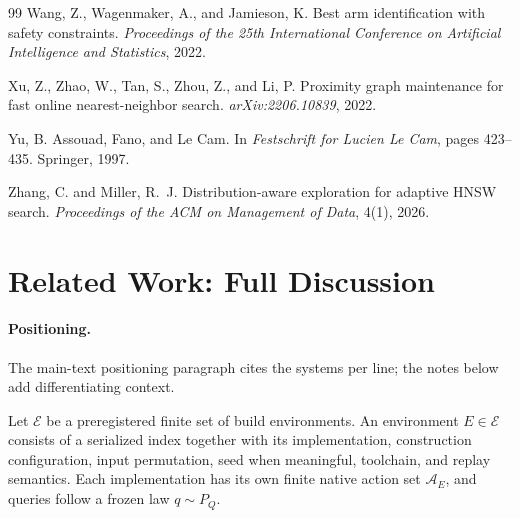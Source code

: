 \documentclass{article}
\newcommand{\Acal}{\mathcal{A}}
\newcommand{\Ecal}{\mathcal{E}}
\begin{document}
\begin{thebibliography}{99}
Wang, Z., Wagenmaker, A., and Jamieson, K.
Best arm identification with safety constraints.
\emph{Proceedings of the 25th International Conference on Artificial Intelligence and Statistics}, 2022.

Xu, Z., Zhao, W., Tan, S., Zhou, Z., and Li, P.
Proximity graph maintenance for fast online nearest-neighbor search.
\emph{arXiv:2206.10839}, 2022.

Yu, B.
Assouad, Fano, and Le Cam.
In \emph{Festschrift for Lucien Le Cam}, pages 423--435. Springer, 1997.

Zhang, C. and Miller, R.~J.
Distribution-aware exploration for adaptive HNSW search.
\emph{Proceedings of the ACM on Management of Data}, 4(1), 2026.

\end{thebibliography}


\appendix
\section{Related Work: Full Discussion}
\label{app:related}

\paragraph{Positioning.}
The main-text positioning paragraph cites the systems per line; the notes below add
differentiating context.
\label{sec:formulation}

Let $\Ecal$ be a preregistered finite set of build environments. An environment $E\in\Ecal$ consists of a
serialized index together with its implementation, construction configuration, input permutation, seed when
meaningful, toolchain, and replay semantics. Each implementation has its own finite native action set
$\Acal_E$, and queries follow a frozen law $q\sim P_Q$.
\end{document}
